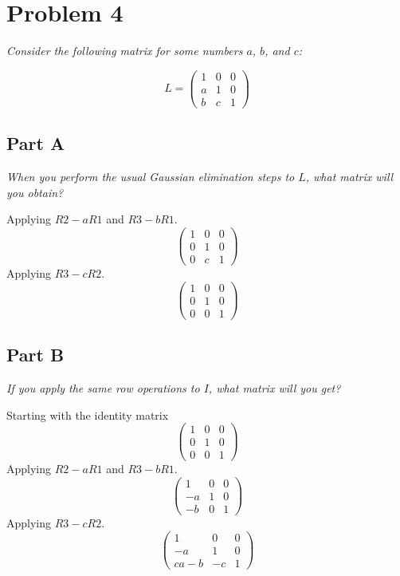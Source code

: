 \documentclass{article}
\begin{document}
\section*{Problem 4}

\textit{Consider the following matrix for some numbers $a$, $b$, and $c$:}

\[
    L = \begin{pmatrix}
        1 & 0 & 0 \\
        a & 1 & 0 \\
        b & c & 1
    \end{pmatrix}
\]

\subsection*{Part A}

\textit{When you perform the usual Gaussian elimination steps to $L$, what
matrix will you obtain?}

\bigbreak

Applying $ R2 - a R1 $ and $ R3 - b R1 $.
\[
    \begin{pmatrix}
        1 & 0 & 0 \\
        0 & 1 & 0 \\
        0 & c & 1
    \end{pmatrix}
\]
Applying $ R3 - c R2 $.
\[
    \begin{pmatrix}
        1 & 0 & 0 \\
        0 & 1 & 0 \\
        0 & 0 & 1
    \end{pmatrix}
\]

\subsection*{Part B}

\textit{If you apply the same row operations to $I$, what matrix will you get?}

\bigbreak

Starting with the identity matrix
\[
    \begin{pmatrix}
        1 & 0 & 0 \\
        0 & 1 & 0 \\
        0 & 0 & 1
    \end{pmatrix}
\]
Applying $ R2 - a R1 $ and $ R3 - b R1 $.
\[
    \begin{pmatrix}
        1 & 0 & 0 \\
        -a & 1 & 0 \\
        -b & 0 & 1
    \end{pmatrix}
\]
Applying $ R3 - c R2 $.
\[
    \begin{pmatrix}
        1 & 0 & 0 \\
        -a & 1 & 0 \\
        ca - b & -c & 1
    \end{pmatrix}
\]
\end{document}

